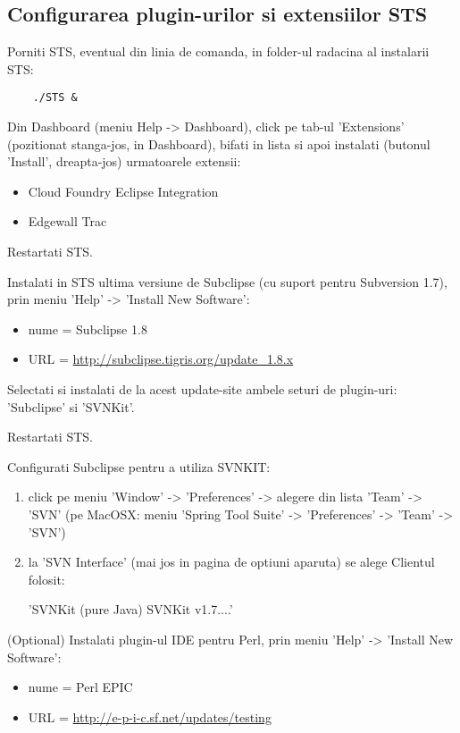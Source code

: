 \subsection{Configurarea plugin-urilor si extensiilor STS}

Porniti STS, eventual din linia de comanda, in folder-ul radacina al instalarii STS:
\begin{lstlisting}	
	./STS &
\end{lstlisting}

Din Dashboard (meniu Help -> Dashboard), click pe tab-ul 'Extensions'
(pozitionat stanga-jos, in Dashboard), bifati in lista si apoi instalati
(butonul 'Install', dreapta-jos) urmatoarele extensii:
\begin{itemize}
\item
Cloud Foundry Eclipse Integration
\item
Edgewall Trac
\end{itemize} 

Restartati STS.

Instalati in STS ultima versiune de Subclipse (cu suport pentru Subversion 1.7),
prin meniu 'Help' -> 'Install New Software':
\begin{itemize}
\item 
nume = Subclipse 1.8
\item
URL = \url{http://subclipse.tigris.org/update_1.8.x}
\end{itemize}

Selectati si instalati de la acest update-site ambele seturi de plugin-uri:
'Subclipse' si 'SVNKit'.

Restartati STS.

Configurati Subclipse pentru a utiliza SVNKIT:
\begin{enumerate}
\item 
click pe meniu 'Window' -> 'Preferences' -> alegere din lista 'Team' -> 'SVN'
(pe MacOSX: meniu 'Spring Tool Suite' -> 'Preferences' -> 'Team' -> 'SVN')
\item
la 'SVN Interface' (mai jos in pagina de optiuni aparuta) se alege Clientul
folosit:

'SVNKit (pure Java) SVNKit v1.7....'
\end{enumerate}

(Optional) Instalati plugin-ul IDE pentru Perl, prin meniu 'Help' -> 
'Install New Software':
\begin{itemize}
\item 
nume = Perl EPIC
\item
URL = \url{http://e-p-i-c.sf.net/updates/testing}
\end{itemize}

